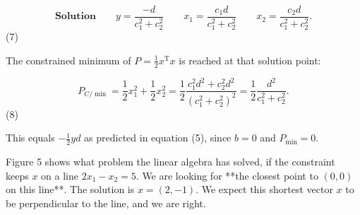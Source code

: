 \[\textbf{Solution}\qquad y=\frac{-d}{c_{1}^{2}+c_{2}^{2}}\qquad x_{1}=\frac{c_{ 1}d}{c_{1}^{2}+c_{2}^{2}}\qquad x_{2}=\frac{c_{2}d}{c_{1}^{2}+c_{2}^{2}}.\] (7)

The constrained minimum of \(P=\frac{1}{2}x^{\mathrm{T}}x\) is reached at that solution point:

\[P_{C/\min}=\frac{1}{2}x_{1}^{2}+\frac{1}{2}x_{2}^{2}=\frac{1}{2}\frac{c_{1}^{ 2}d^{2}+c_{2}^{2}d^{2}}{(c_{1}^{2}+c_{2}^{2})^{2}}=\frac{1}{2}\frac{d^{2}}{c_ {1}^{2}+c_{2}^{2}}.\] (8)

This equals \(-\frac{1}{2}yd\) as predicted in equation (5), since \(b=0\) and \(P_{\min}=0\).

Figure 5 shows what problem the linear algebra has solved, if the constraint keeps \(x\) on a line \(2x_{1}-x_{2}=5\). We are looking for **the closest point to \((0,0)\) on this line**. The solution is \(x=(2,-1)\). We expect this shortest vector \(x\) to be perpendicular to the line, and we are right.

 